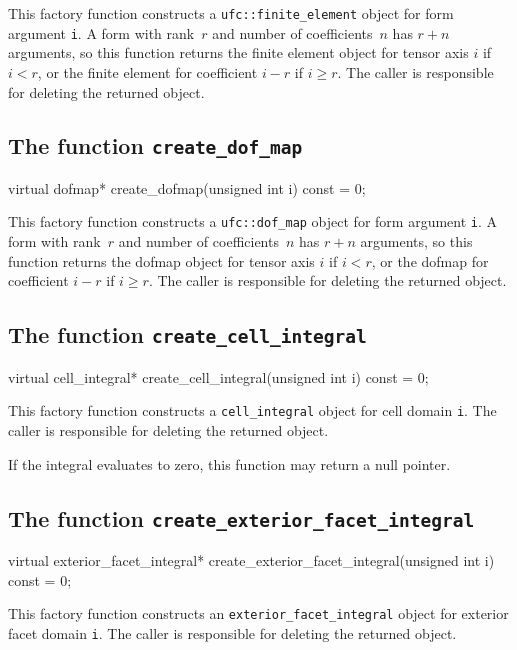 This factory function constructs a \texttt{ufc::finite\_element}
object for form argument \texttt{i}. A form with rank~$r$ and number
of coefficients~$n$ has $r + n$ arguments, so this function returns
the finite element object for tensor axis $i$ if $i < r$, or the
finite element for coefficient $i - r$ if $i \geq r$.  The caller is
responsible for deleting the returned object.

\subsection{The function \texttt{create\_dof\_map}}

\begin{code}
virtual dofmap*
create_dofmap(unsigned int i) const = 0;
\end{code}

This factory function constructs a \texttt{ufc::dof\_map} object for
form argument \texttt{i}. A form with rank~$r$ and number of
coefficients~$n$ has $r + n$ arguments, so this function returns the
dofmap object for tensor axis $i$ if $i < r$, or the dofmap for
coefficient $i - r$ if $i \geq r$.  The caller is responsible for
deleting the returned object.

\subsection{The function \texttt{create\_cell\_integral}}

\begin{code}
virtual cell_integral*
create_cell_integral(unsigned int i) const = 0;
\end{code}

This factory function constructs a \texttt{cell\_integral} object for
cell domain \texttt{i}. The caller is responsible for deleting the
returned object.

If the integral evaluates to zero, this function may return a null
pointer.

\subsection{The function \texttt{create\_exterior\_facet\_integral}}

\begin{code}
virtual exterior_facet_integral*
create_exterior_facet_integral(unsigned int i) const = 0;
\end{code}

This factory function constructs an \texttt{exterior\_facet\_integral}
object for exterior facet domain \texttt{i}. The caller is responsible
for deleting the returned object.

